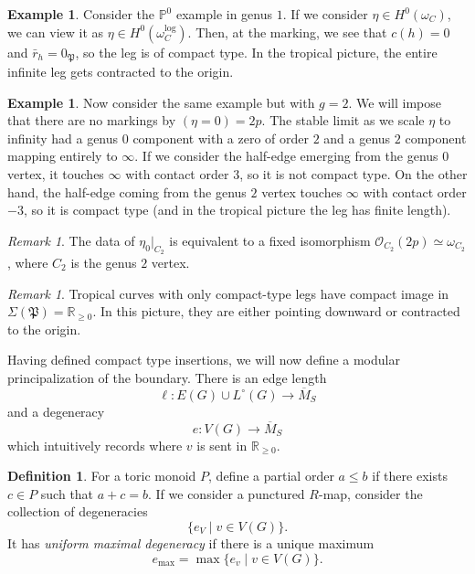 \documentclass[10pt,oldfontcommands,oneside]{memoir}
\theoremstyle{definition}
\newtheorem{defn}[thm]{Definition}
\newtheorem{exm}[thm]{Example}
\theoremstyle{remark}
\newtheorem{rmk}[thm]{Remark}
\theoremstyle{plain}
\theoremstyle{definition}
\theoremstyle{remark}
\newcommand{\R}{\mathbb{R}}
\renewcommand{\P}{\mathbb{P}}
\newcommand{\mc}[1]{\mathcal{#1}}
\newcommand{\mf}[1]{\mathfrak{#1}}
\newcommand{\ol}[1]{\overline{#1}}
\newcommand{\1}{\mathbf{1}}
\newcommand{\2}{\mathbf{2}}
\newcommand{\3}{\mathbf{3}}
\begin{document}
\begin{exm}
    Consider the $\P^0$ example in genus $1$. If we consider $\eta \in H^0(\omega_C)$, we can view it as $\eta \in H^0(\omega_C^{\log})$. Then, at the marking, we see that $c(h) = 0$ and $\bar{r}_h = 0_{\mf{P}}$, so the leg is of compact type. In the tropical picture, the entire infinite leg gets contracted to the origin.
\end{exm}

\begin{exm}
    Now consider the same example but with $g=2$. We will impose that there are no markings by $(\eta = 0) = 2p$. The stable limit as we scale $\eta$ to infinity had a genus $0$ component with a zero of order $2$ and a genus $2$ component mapping entirely to $\infty$. If we consider the half-edge emerging from the genus $0$ vertex, it touches $\infty$ with contact order $3$, so it is not compact type. On the other hand, the half-edge coming from the genus $2$ vertex touches $\infty$ with contact order $-3$, so it is compact type (and in the tropical picture the leg has finite length).

    \begin{rmk}
        The data of $\eta_0 |_{C_2}$ is equivalent to a fixed isomorphism $\mc{O}_{C_2}(2p) \simeq \omega_{C_2}$, where $C_2$ is the genus $2$ vertex.
    \end{rmk}
\end{exm}

\begin{rmk}
    Tropical curves with only compact-type legs have compact image in $\Sigma(\mf{P}) = \R_{\geq 0}$. In this picture, they are either pointing downward or contracted to the origin.
\end{rmk}

Having defined compact type insertions, we will now define a modular principalization of the boundary. There is an edge length
\[ \ell \colon E(G) \cup L^{\circ}(G) \to \ol{M}_S \]
and a degeneracy
\[ e \colon V(G) \to \ol{M}_S \]
which intuitively records where $v$ is sent in $\R_{\geq 0}$.

\begin{defn}
    For a toric monoid $P$, define a partial order $a \leq b$ if there exists $c \in P$ such that $a+c = b$. If we consider a punctured $R$-map, consider the collection of degeneracies
    \[ \{ e_V \mid v \in V(G)\}. \]
    It has \textit{uniform maximal degeneracy} if there is a unique maximum
    \[ e_{\max} = \max \{e_v \mid v \in V(G)\}. \]
\end{defn}
\end{document}
